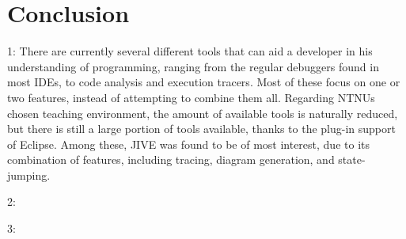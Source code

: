 \section{Conclusion}\label{Conclusion}

1: There are currently several different tools that can aid a developer in his understanding of programming, ranging from the regular debuggers found in most IDEs, to code analysis and execution tracers.
Most of these focus on one or two features, instead of attempting to combine them all.
Regarding NTNUs chosen teaching environment, the amount of available tools is naturally reduced, but there is still a large portion of tools available, thanks to the plug-in support of Eclipse.
Among these, JIVE was found to be of most interest, due to its combination of features, including tracing, diagram generation, and state-jumping.

2:

3:
